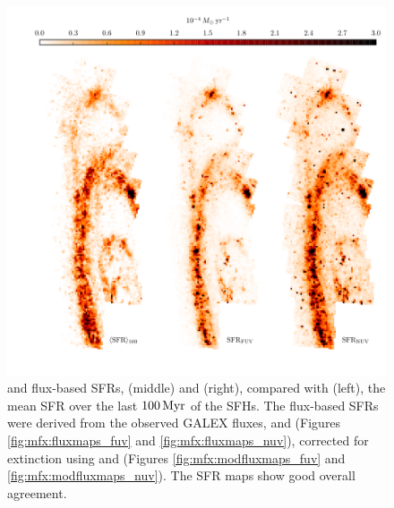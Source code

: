 \documentclass[iop, tighten]{emulateapj}
\begin{document}
\begin{figure}
\centering
\includegraphics[width=\textwidth]{m31flux-figures/sfrmaps1.pdf}
\caption[SFR maps from estimates based on observed fluxes compared with the
    mean SFR map from the SFHs.]{\fuv{} and \nuv{} flux-based SFRs, \sfrfuv{}
    (middle) and \sfrnuv{} (right), compared with \sfroneh{} (left), the mean
    SFR over the last $100\,\mathrm{Myr}$ of the SFHs. The flux-based SFRs were derived
    from the observed GALEX fluxes, \fuvobs{} and \nuvobs{} (Figures
    \ref{fig:mfx:fluxmaps_fuv} and \ref{fig:mfx:fluxmaps_nuv}), corrected for
    extinction using \afuv{} and \anuv{} (Figures \ref{fig:mfx:modfluxmaps_fuv}
    and \ref{fig:mfx:modfluxmaps_nuv}). The SFR maps show good overall
    agreement.
}
\label{fig:mfx:sfrmaps1}
\end{figure}
\end{document}
